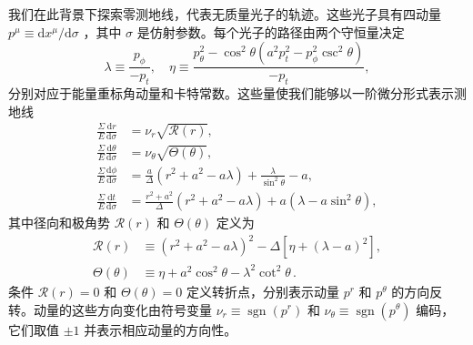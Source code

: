 \documentclass[aps,reprint,superscriptaddress,nofootinbib,floatfix,longbibliography,preprintnumbers]{revtex4-1}
\newcommand{\dd}{\mathrm{d}}
\begin{document}
我们在此背景下探索零测地线，代表无质量光子的轨迹。这些光子具有四动量    $p^{\mu} \equiv {\dd x^{\mu}}/{\dd \sigma}$    ，其中    $\sigma$    是仿射参数。每个光子的路径由两个守恒量决定~    \cite{Carter:1968rr,Gralla:2019ceu,Lupsasca:2024wkp}    
   \begin{equation}
    \lambda\equiv\frac{p_\phi}{-p_t}, \quad
    \eta\equiv\frac{p_\theta^2-\cos^2\theta(a^2p_t^2-p_\phi^2\csc^2\theta)}{-p_t}, \label{eq:def lambda eta}
\end{equation}    分别对应于能量重标角动量和卡特常数。这些量使我们能够以一阶微分形式表示测地线
   \begin{subequations}
\label{eq:p}
    \begin{align}
        \frac{\Sigma}{E}\frac{\dd r}{\dd \sigma}&=\nu_r\sqrt{\mathcal{R}(r)},\label{eq:pr} \\ 
        \frac{\Sigma}{E}\frac{\dd \theta}{\dd \sigma}&=\nu_{\theta}\sqrt{\Theta(\theta)},\label{eq:ptheta} \\ 
        \frac{\Sigma}{E}\frac{\dd \phi}{\dd \sigma}&= \frac{a}{\Delta}(r^2+a^2-a\lambda)+\frac{\lambda}{\sin^2\theta}-a,\label{eq:pphi} \\ 
          \frac{\Sigma}{E}\frac{\dd t}{\dd \sigma}&=\frac{r^2+a^2}{\Delta}(r^2+a^2-a\lambda)+a(\lambda-a\sin^2\theta),\label{eq:pt}
    \end{align}
\end{subequations}    其中径向和极角势    $\mathcal{R}(r)$    和    $\Theta(\theta)$    定义为
   \begin{align}
    \mathcal{R}(r)&\equiv(r^2+a^2-a\lambda)^2-\Delta\left[\eta+(\lambda-a)^2\right], \\ 
    \Theta(\theta)&\equiv\eta+a^2\cos^2\theta-\lambda^2\cot^2\theta\,.
\end{align}    条件    $\mathcal{R}(r) = 0$    和    $\Theta(\theta) = 0$    定义转折点，分别表示动量    $p^r$    和    $p^\theta$    的方向反转。动量的这些方向变化由符号变量    $\nu_r \equiv \operatorname{sgn}(p^r)$    和    $\nu_\theta \equiv \operatorname{sgn}(p^\theta)$    编码，它们取值    $\pm 1$    并表示相应动量的方向性。  
\end{document}
